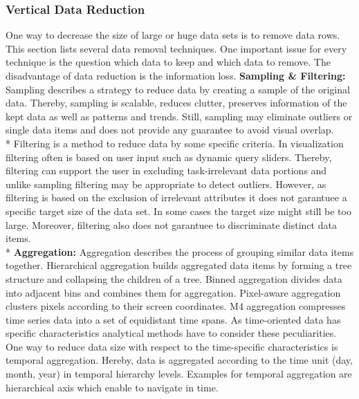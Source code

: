 \subsubsection{Vertical Data Reduction}
One way to decrease the size of large or huge data sets is to remove data rows. This section lists several data removal techniques.  One important issue for every technique is the question which data to keep and which data to remove. The disadvantage of data reduction is the information loss.
\textbf{Sampling & Filtering: }
Sampling describes a strategy to reduce data by creating a sample of the original data. Thereby, sampling is scalable, reduces clutter, preserves information of the kept data as well as patterns and trends\cite{PiringerHarald2011}. Still, sampling may eliminate outliers or single data items and does not provide any guarantee to avoid visual overlap. \\*
Filtering is a method to reduce data by some specific criteria. In visualization filtering often is based on user input such as dynamic query sliders. Thereby, filtering can support the user in excluding task-irrelevant data portions and unlike sampling filtering may be appropriate to detect outliers. However, as filtering is based on the exclusion of irrelevant attributes it does not garantuee a specific target size of the data set. In some cases the target size might still be too large. Moreover, filtering also does not garantuee to discriminate distinct data items\cite{PiringerHarald2011}.\\*
\textbf{Aggregation: }
Aggregation describes the process of grouping similar data items together. Hierarchical aggregation builds aggregated data items by forming a tree structure and collapsing the children of a tree\cite{elmqvist2010hierarchical}. Binned aggregation divides data into adjacent bins and combines them for aggregation\cite{Liu2013}. Pixel-aware aggregation clusters pixels according to their screen coordinates\cite{li2016polyspector}. M4 aggregation compresses time series data into a set of equidistant time spans\cite{jugel2014m4}.
As time-oriented data has specific characteristics analytical methods have to consider these peculiarities. One way to reduce data size with respect to the time-specific characteristics is temporal aggregation. Hereby, data is aggregated according to the time unit (day, month, year) in temporal hierarchy levels. Examples for temporal aggregation are hierarchical axis \cite{Chung2014} which enable to navigate in time. 
